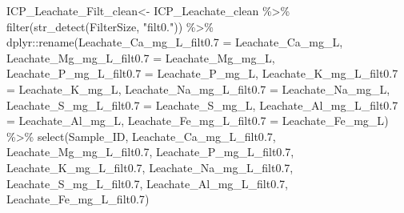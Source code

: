 \documentclass[
]{article}
\newenvironment{Shaded}{\begin{snugshade}}{\end{snugshade}}
\newcommand{\AttributeTok}[1]{\textcolor[rgb]{0.77,0.63,0.00}{#1}}
\newcommand{\FloatTok}[1]{\textcolor[rgb]{0.00,0.00,0.81}{#1}}
\newcommand{\FunctionTok}[1]{\textcolor[rgb]{0.00,0.00,0.00}{#1}}
\newcommand{\NormalTok}[1]{#1}
\newcommand{\OtherTok}[1]{\textcolor[rgb]{0.56,0.35,0.01}{#1}}
\newcommand{\SpecialCharTok}[1]{\textcolor[rgb]{0.00,0.00,0.00}{#1}}
\newcommand{\StringTok}[1]{\textcolor[rgb]{0.31,0.60,0.02}{#1}}
\begin{document}
\begin{Shaded}
\begin{Highlighting}[]
\NormalTok{ICP\_Leachate\_Filt\_clean}\OtherTok{\textless{}{-}}\NormalTok{ ICP\_Leachate\_clean }\SpecialCharTok{\%\textgreater{}\%}
                \FunctionTok{filter}\NormalTok{(}\FunctionTok{str\_detect}\NormalTok{(FilterSize, }\StringTok{"filt0."}\NormalTok{)) }\SpecialCharTok{\%\textgreater{}\%}
\NormalTok{  dplyr}\SpecialCharTok{::}\FunctionTok{rename}\NormalTok{(}\AttributeTok{Leachate\_Ca\_mg\_L\_filt0.7 =} \StringTok{\textquotesingle{}Leachate\_Ca\_mg\_L\textquotesingle{}}\NormalTok{,}
                \AttributeTok{Leachate\_Mg\_mg\_L\_filt0.7 =} \StringTok{\textquotesingle{}Leachate\_Mg\_mg\_L\textquotesingle{}}\NormalTok{,}
                \AttributeTok{Leachate\_P\_mg\_L\_filt0.7 =} \StringTok{\textquotesingle{}Leachate\_P\_mg\_L\textquotesingle{}}\NormalTok{,}
                \AttributeTok{Leachate\_K\_mg\_L\_filt0.7 =} \StringTok{\textquotesingle{}Leachate\_K\_mg\_L\textquotesingle{}}\NormalTok{,}
                \AttributeTok{Leachate\_Na\_mg\_L\_filt0.7 =} \StringTok{\textquotesingle{}Leachate\_Na\_mg\_L\textquotesingle{}}\NormalTok{,}
                \AttributeTok{Leachate\_S\_mg\_L\_filt0.7 =} \StringTok{\textquotesingle{}Leachate\_S\_mg\_L\textquotesingle{}}\NormalTok{,}
                \AttributeTok{Leachate\_Al\_mg\_L\_filt0.7 =} \StringTok{\textquotesingle{}Leachate\_Al\_mg\_L\textquotesingle{}}\NormalTok{,}
                \AttributeTok{Leachate\_Fe\_mg\_L\_filt0.7 =} \StringTok{\textquotesingle{}Leachate\_Fe\_mg\_L\textquotesingle{}}\NormalTok{) }\SpecialCharTok{\%\textgreater{}\%}
  \FunctionTok{select}\NormalTok{(Sample\_ID, Leachate\_Ca\_mg\_L\_filt0}\FloatTok{.7}\NormalTok{,  Leachate\_Mg\_mg\_L\_filt0}\FloatTok{.7}\NormalTok{, Leachate\_P\_mg\_L\_filt0}\FloatTok{.7}\NormalTok{, Leachate\_K\_mg\_L\_filt0}\FloatTok{.7}\NormalTok{, Leachate\_Na\_mg\_L\_filt0}\FloatTok{.7}\NormalTok{, Leachate\_S\_mg\_L\_filt0}\FloatTok{.7}\NormalTok{, Leachate\_Al\_mg\_L\_filt0}\FloatTok{.7}\NormalTok{, Leachate\_Fe\_mg\_L\_filt0}\FloatTok{.7}\NormalTok{)}


\end{Highlighting}
\end{Shaded}
\end{document}
